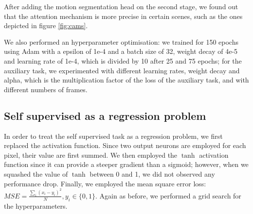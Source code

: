 \documentclass[10pt,twocolumn,letterpaper]{article}
\begin{document}
After adding the motion segmentation head on the second stage, we found out that the attention mechanism is more precise in certain scenes, such as the ones depicted in figure \ref{fig:cams}.

We also performed an hyperparameter optimisation: we trained for 150 epochs using Adam with a epsilon of 1e-4 and a batch size of 32, weight decay of 4e-5 and learning rate of 1e-4, which is divided by 10 after 25 and 75 epochs; for the auxiliary task, we experimented with different learning rates, weight decay and alpha, which is the multiplication factor of the loss of the auxiliary task, and with different numbers of frames.

\subsection{Self supervised as a regression problem}

In order to treat the self supervised task as a regression problem, we first replaced the activation function. Since two output neurons are employed for each pixel, their value are first summed. We then employed the $\tanh$ activation function since it can provide a steeper gradient than a sigmoid; however, when we squashed the value of $\tanh$ between 0 and 1, we did not observed any performance drop. Finally, we employed the mean square error loss: $ MSE = \frac{\sum_i (x_i - y_i)^2}{N}, y_i \in \{0, 1\}$. Again as before, we performed a grid search for the hyperparameters.
\end{document}
